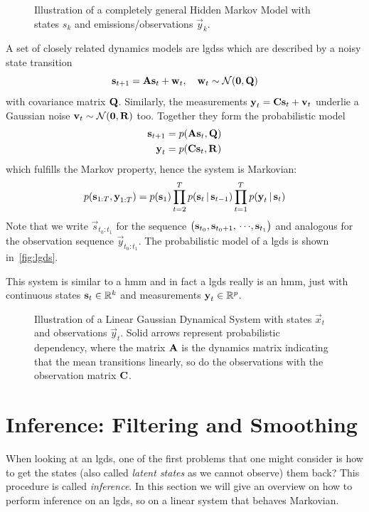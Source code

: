 	\begin{figure}
		\centering
		\tikzHiddenMarkovModel
		\caption{Illustration of a completely general Hidden Markov Model with states \(s_k\) and emissions/observations \(\vec{y}_k\).}
		\label{fig:hiddenMarkovModel}
	\end{figure}

	A set of closely related dynamics models are \acp{lgds} which are described by a noisy state transition
	\begin{equation*}
		\boldsymbol{\mathrm{s}}_{t + 1} = \boldsymbol{\mathrm{A}} \boldsymbol{\mathrm{s}}_t + \boldsymbol{\mathrm{w}}_t,\quad \boldsymbol{\mathrm{w}}_t \sim \mathcal{N}(\boldsymbol{\mathrm{0}}, \boldsymbol{\mathrm{Q}})
	\end{equation*}
	with covariance matrix \(\boldsymbol{\mathrm{Q}}\). Similarly, the measurements \( \boldsymbol{\mathrm{y}}_t = \boldsymbol{\mathrm{C}} \boldsymbol{\mathrm{s}}_t + \boldsymbol{\mathrm{v}}_t \) underlie a Gaussian noise \( \boldsymbol{\mathrm{v}}_t \sim \mathcal{N}(\boldsymbol{\mathrm{0}}, \boldsymbol{\mathrm{R}}) \) too. Together they form the probabilistic model
	\begin{align*}
		\boldsymbol{\mathrm{s}}_{t + 1} &= p(\boldsymbol{\mathrm{A}} \boldsymbol{\mathrm{s}}_t, \boldsymbol{\mathrm{Q}}) \\
		\boldsymbol{\mathrm{y}}_t &= p(\boldsymbol{\mathrm{C}} \boldsymbol{\mathrm{s}}_t, \boldsymbol{\mathrm{R}})
	\end{align*}
	which fulfills the Markov property, hence the system is Markovian:
	\begin{equation*}
		p(\boldsymbol{\mathrm{s}}_{1:T}, \boldsymbol{\mathrm{y}}_{1:T}) = p(\boldsymbol{\mathrm{s}}_1) \prod_{t = 2}^{T} p(\boldsymbol{\mathrm{s}}_t \,\vert\, \boldsymbol{\mathrm{s}}_{t - 1}) \prod_{t = 1}^{T} p(\boldsymbol{\mathrm{y}}_t \,\vert\, \boldsymbol{\mathrm{s}}_t)
	\end{equation*}
	Note that we write \( \vec{s}_{t_0:t_1} \) for the sequence \( \big( \boldsymbol{\mathrm{s}}_{t_0}, \boldsymbol{\mathrm{s}}_{t_0 + 1}, \,\cdots\!, \boldsymbol{\mathrm{s}}_{t_1} \big) \) and analogous for the observation sequence \( \vec{y}_{t_0:t_1} \). The probabilistic model of a \ac{lgds} is shown in~\autoref{fig:lgds}.

	This system is similar to a \ac{hmm} and in fact a \ac{lgds} really is an \ac{hmm}, just with continuous states \( \boldsymbol{\mathrm{s}}_t \in \mathbb{R}^k \) and measurements \( \boldsymbol{\mathrm{y}}_t \in \mathbb{R}^p \).

	\begin{figure}
		\centering
		\tikzLinearGaussianDynamicalSystem
		\caption{Illustration of a Linear Gaussian Dynamical System with states \(\vec{x}_t\) and observations \(\vec{y}_t\). Solid arrows represent probabilistic dependency, where the matrix \(\boldsymbol{\mathrm{A}}\) is the dynamics matrix indicating that the mean transitions linearly, so do the observations with the observation matrix \(\boldsymbol{\mathrm{C}}\).}
		\label{fig:lgds}
	\end{figure}

\section{Inference: Filtering and Smoothing}
	When looking at an \ac{lgds}, one of the first problems that one might consider is how to get the states (also called \emph{latent states} as we cannot observe) them back? This procedure is called \emph{inference}. In this section we will give an overview on how to perform inference on an \ac{lgds}, so on a linear system that behaves Markovian.


